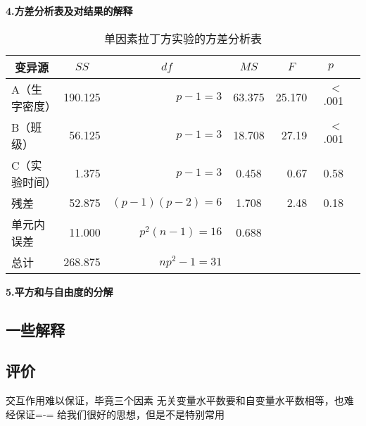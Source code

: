 \textbf{4.方差分析表及对结果的解释}

\begin{table}[h]
	\centering
	\caption{单因素拉丁方实验的方差分析表}
	{
		\begin{tabular}{lrrcrrr}
			\toprule
			\multicolumn{1}{c}{变异源} & \multicolumn{1}{c}{$SS$} & \multicolumn{1}{c}{$df$} & \multicolumn{1}{c}{$MS$} & \multicolumn{1}{c}{$F$} & \multicolumn{1}{c}{$p$} \\
			\midrule
			A（生字密度） & 190.125 & $p-1=3$ & 63.375 & 25.170 & $<$.001  \\
			B（班级） & 56.125 & $p-1=3$ & 18.708 & 27.19 & $<$.001   \\
			C（实验时间） & 1.375 & $p-1=3$ & 0.458 & 0.67 &  0.58  \\
			残差 & 52.875 & $(p-1)(p-2)=6$ & 1.708 & 2.48 & 0.18\\
			单元内误差 & 11.000 & $p^2(n-1)=16$ & 0.688\\
			\midrule
			总计 & 268.875 & $np^2-1=31$ & & &\\
			\bottomrule
		\end{tabular}
	}
\end{table}

\textbf{5.平方和与自由度的分解}

\subsection{一些解释}

\subsection{评价}
交互作用难以保证，毕竟三个因素
无关变量水平数要和自变量水平数相等，也难经保证=-=
给我们很好的思想，但是不是特别常用